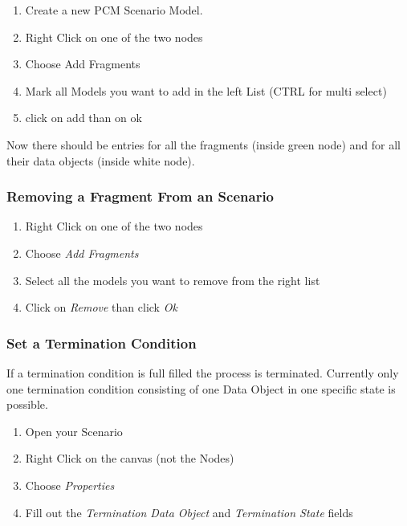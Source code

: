 \documentclass{acm_proc_article-sp}
\begin{document}
\begin{enumerate}
\def\labelenumi{\arabic{enumi}.}
\itemsep1pt\parskip0pt
\item
  Create a new PCM Scenario Model.
\item
  Right Click on one of the two nodes
\item
  Choose Add Fragments
\item
  Mark all Models you want to add in the left List (CTRL for multi
  select)
\item
  click on add than on ok
\end{enumerate}

Now there should be entries for all the fragments (inside green node)
and for all their data objects (inside white node).

\subsubsection{Removing a Fragment From an
Scenario}\label{removing-a-fragment-from-an-scenario}

\begin{enumerate}
\def\labelenumi{\arabic{enumi}.}
\itemsep1pt\parskip0pt
\item
  Right Click on one of the two nodes
\item
  Choose \emph{Add Fragments}
\item
  Select all the models you want to remove from the right list
\item
  Click on \emph{Remove} than click \emph{Ok}
\end{enumerate}

\subsubsection{Set a Termination
Condition}\label{set-a-termination-condition}

If a termination condition is full filled the process is terminated.
Currently only one termination condition consisting of one Data Object
in one specific state is possible.

\begin{enumerate}
\def\labelenumi{\arabic{enumi}.}
\itemsep1pt\parskip0pt
\item
  Open your Scenario
\item
  Right Click on the canvas (not the Nodes)
\item
  Choose \emph{Properties}
\item
  Fill out the \emph{Termination Data Object} and \emph{Termination
  State} fields
\end{enumerate}
\end{document}
